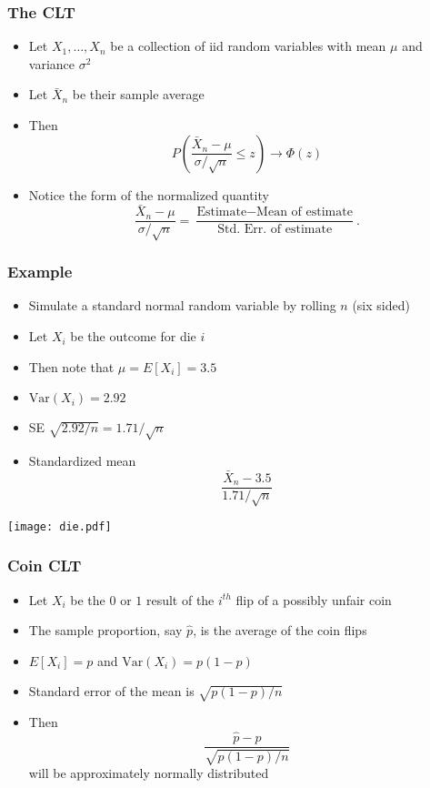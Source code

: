 \documentclass[aspectratio=169]{beamer}
\newcommand{\Var}{\mathrm{Var}}
\begin{document}
\begin{frame}\frametitle{The CLT}
  \begin{itemize}
  \item Let $X_1,\ldots,X_n$ be a collection of iid random variables
    with mean $\mu$ and variance $\sigma^2$
  \item Let $\bar X_n$ be their sample average
  \item Then
    \begin{equation*}
      P\left( \frac{\bar X_n - \mu}{\sigma / \sqrt{n}} \leq z \right) \rightarrow \Phi(z)
    \end{equation*}
  \item Notice the form of the normalized quantity
    $$
    \frac{\bar X_n - \mu}{\sigma / \sqrt{n}} = 
    \frac{\mbox{Estimate} - \mbox{Mean of estimate}}{\mbox{Std. Err. of estimate}}.
    $$
  \end{itemize}
\end{frame}

\begin{frame}\frametitle{Example}
  \begin{itemize}
  \item  Simulate a standard normal random variable by rolling $n$
    (six sided)
  \item Let $X_i$ be the outcome for die $i$
  \item Then note that $\mu = E[X_i] = 3.5$
  \item $\Var(X_i) = 2.92$ 
  \item SE $\sqrt{2.92 / n} = 1.71 / \sqrt{n}$
  \item Standardized mean
    $$
    \frac{\bar X_n - 3.5}{1.71/\sqrt{n}}
    $$ 
  \end{itemize}
\end{frame}

\begin{frame}
  \texttt{[image: die.pdf]}
\end{frame}

\begin{frame}\frametitle{Coin CLT}
  \begin{itemize}
  \item Let $X_i$ be the $0$ or $1$ result of the $i^{th}$ flip of a
    possibly unfair coin
  \item The sample proportion, say $\hat p$, is the average of the coin flips
  \item $E[X_i] = p$ and $\Var(X_i) = p(1-p)$
  \item Standard error of the mean is $\sqrt{p(1-p)/n}$
  \item Then
    $$
    \frac{\hat p - p}{\sqrt{p(1-p)/n}}
    $$
    will be approximately normally distributed
  \end{itemize}
\end{frame}
\end{document}
